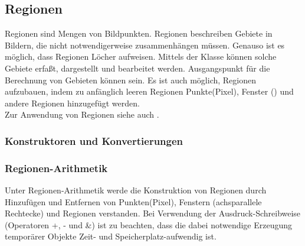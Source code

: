 {


\subsection{Regionen}
\hypertarget{Region}{}

Regionen sind Mengen von Bildpunkten. Regionen beschreiben Gebiete in Bildern,
die nicht notwendigerweise zusammenhängen müssen. Genauso ist es möglich, dass
Regionen Löcher aufweisen. Mittels der Klasse  können solche Gebiete
erfaßt, dargestellt und bearbeitet werden. Ausgangspunkt für die Berechnung von
Gebieten können  sein. Es ist auch möglich, Regionen aufzubauen,
indem zu anfänglich leeren Regionen Punkte(Pixel), Fenster () 
und andere Regionen hinzugefügt werden.\\
Zur Anwendung von Regionen siehe auch .

\subsubsection{Konstruktoren und Konvertierungen}




\subsubsection{Regionen-Arithmetik}
Unter Regionen-Arithmetik werde die Konstruktion von Regionen durch Hinzufügen
und Entfernen von Punkten(Pixel), Fenstern (achsparallele Rechtecke) und
Regionen verstanden. 
Bei Verwendung der Ausdruck-Schreibweise (Operatoren +, - und \&) ist zu 
beachten, dass die dabei notwendige Erzeugung temporärer Objekte
Zeit- und Speicherplatz-aufwendig ist.



}
